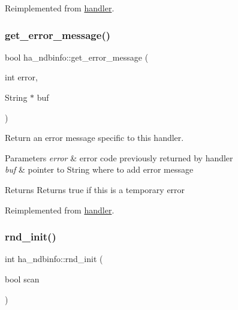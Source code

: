 Reimplemented from \mbox{\hyperlink{classhandler_ae59e9a1d36d852f4dd5dd00bff5f1ae4}{handler}}.

\mbox{\label{classha__ndbinfo_ab3693b75133ce5d4e4861ef5627ebbdc}} 
\subsubsection{\texorpdfstring{get\+\_\+error\+\_\+message()}{get\_error\_message()}}
{\footnotesize\ttfamily bool ha\+\_\+ndbinfo\+::get\+\_\+error\+\_\+message (\begin{DoxyParamCaption}\item[{int}]{error,  }\item[{String $\ast$}]{buf }\end{DoxyParamCaption})\hspace{0.3cm}{\ttfamily [virtual]}}

Return an error message specific to this handler.


\begin{DoxyParams}{Parameters}
{\em error} & error code previously returned by handler \\
\hline
{\em buf} & pointer to String where to add error message\\
\hline
\end{DoxyParams}
\begin{DoxyReturn}{Returns}
Returns true if this is a temporary error 
\end{DoxyReturn}


Reimplemented from \mbox{\hyperlink{classhandler_afce8ffd064ce683481494c7503ef820c}{handler}}.

\mbox{\label{classha__ndbinfo_a0157ed0545e9748cccbd9b58a7178529}} 
\subsubsection{\texorpdfstring{rnd\+\_\+init()}{rnd\_init()}}
{\footnotesize\ttfamily int ha\+\_\+ndbinfo\+::rnd\+\_\+init (\begin{DoxyParamCaption}\item[{bool}]{scan }\end{DoxyParamCaption})\hspace{0.3cm}{\ttfamily [virtual]}}

